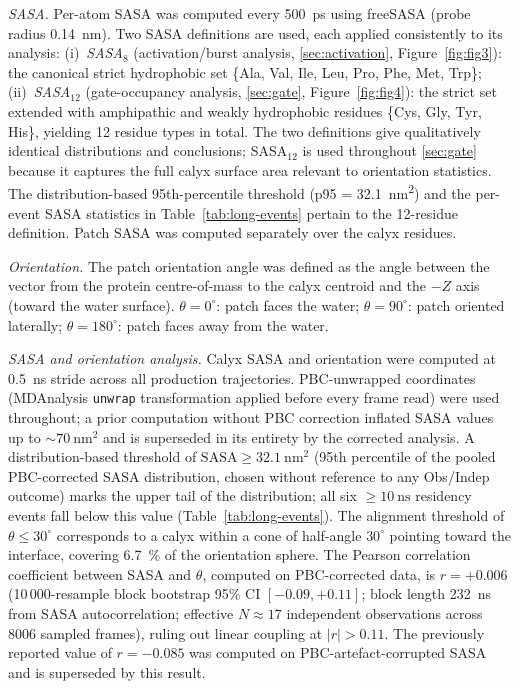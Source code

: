 \documentclass[11pt,a4paper]{article}
\begin{document}
\textit{SASA.} Per-atom SASA was computed every \SI{500}{\pico\second}
using freeSASA\citep{Mitternacht2016} (probe radius
\SI{0.14}{\nano\metre}). Two SASA definitions are used, each applied consistently to its analysis:
(i)~\textit{SASA$_8$} (activation/burst analysis, \cref{sec:activation},
Figure~\ref{fig:fig3}): the canonical strict hydrophobic set
\{Ala, Val, Ile, Leu, Pro, Phe, Met, Trp\};
(ii)~\textit{SASA$_{12}$} (gate-occupancy analysis, \cref{sec:gate},
Figure~\ref{fig:fig4}): the strict set extended with amphipathic and
weakly hydrophobic residues \{Cys, Gly, Tyr, His\}, yielding \num{12}
residue types in total. The two definitions give qualitatively identical
distributions and conclusions; SASA$_{12}$ is used throughout \cref{sec:gate}
because it captures the full calyx surface area relevant to orientation statistics. The
distribution-based 95th-percentile threshold (p95 =
\SI{32.1}{\nano\metre\squared}) and the per-event SASA statistics
in Table~\ref{tab:long-events} pertain to the \num{12}-residue
definition. Patch SASA was computed separately over the calyx residues.

\textit{Orientation.} The patch orientation angle was defined as the
angle between the vector from the protein centre-of-mass to the calyx
centroid and the $-Z$ axis (toward the water surface).
$\theta = 0^\circ$: patch faces the water; $\theta = 90^\circ$: patch
oriented laterally; $\theta = 180^\circ$: patch faces away from the
water.

\textit{SASA and orientation analysis.} Calyx SASA and orientation
were computed at \SI{0.5}{\nano\second} stride across all production
trajectories. PBC-unwrapped coordinates (MDAnalysis \texttt{unwrap}
transformation applied before every frame read) were used throughout;
a prior computation without PBC correction inflated SASA values up to
$\sim\!\SI{70}{\nano\metre\squared}$ and is superseded in its entirety
by the corrected analysis. A distribution-based threshold of
$\mathrm{SASA} \geq \SI{32.1}{\nano\metre\squared}$ (95th percentile
of the pooled PBC-corrected SASA distribution, chosen without reference
to any Obs/Indep outcome) marks the upper tail of the distribution;
all six $\geq\!\SI{10}{\nano\second}$ residency events fall below this
value (Table~\ref{tab:long-events}). The alignment threshold of
$\theta \leq 30^\circ$ corresponds to a calyx within a cone of
half-angle $30^\circ$ pointing toward the interface, covering
\SI{6.7}{\percent} of the orientation sphere. The Pearson correlation
coefficient between SASA and $\theta$, computed on PBC-corrected data,
is $r = +0.006$ (10\,000-resample block bootstrap 95\% CI
$[-0.09, +0.11]$; block length \SI{232}{\nano\second} from SASA
autocorrelation; effective $N \approx 17$ independent observations
across 8006 sampled frames), ruling out linear coupling at $|r| > 0.11$.
The previously reported value of $r = -0.085$ was
computed on PBC-artefact-corrupted SASA and is superseded by this
result.
\end{document}
